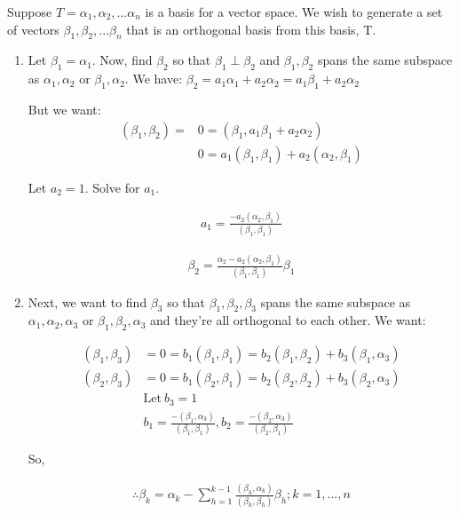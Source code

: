 Suppose $T = {\alpha_1, \alpha_2, ... \alpha_n}$ is a basis for a vector space. We wish to generate a set of vectors ${\beta_1, \beta_2, ... \beta_n}$ that is an orthogonal basis from this basis, T.

\begin{enumerate}
  \item Let $\beta_1 = \alpha_1$. Now, find $\beta_2$ so that $\beta_1 \perp \beta_2$ and $\beta_1, \beta_2$ spans the same subspace as ${\alpha_1, \alpha_2}$ or ${\beta_1, \alpha_2}$. We have: $\beta_2 = a_1\alpha_1 + a_2\alpha_2 = a_1\beta_1 + a_2\alpha_2$

  But we want:
  \begin{align*}
    (\beta_1, \beta_2) = &0 = (\beta_1, a_1\beta_1 + a_2\alpha_2) \\ 
                         &0 = a_1(\beta_1, \beta_1) + a_2(\alpha_2, \beta_1)
  \end{align*}

  Let $a_2 = 1$. Solve for $a_1$.

  \begin{align*}
    a_1 = \frac{-a_2(\alpha_2, \beta_1)}{(\beta_1, \beta_1)}
  \end{align*}

  \begin{align*}
    \beta_2 = \frac{\alpha_2 - a_2(\alpha_2, \beta_1)}{(\beta_1, \beta_1)} \beta_1
  \end{align*}

  \item Next, we want to find $\beta_3$ so that ${\beta_1, \beta_2, \beta_3}$ spans the same subspace as ${\alpha_1, \alpha_2, \alpha_3}$ or ${\beta_1, \beta_2, \alpha_3}$ and they're all orthogonal to each other. We want:

  \begin{align*}
    (\beta_1, \beta_3) &= 0 = b_1(\beta_1, \beta_1) = b_2(\beta_1, \beta_2) + b_3(\beta_1, \alpha_3) \\
    (\beta_2, \beta_3) &= 0 = b_1(\beta_2, \beta_1) = b_2(\beta_2, \beta_2) + b_3(\beta_2, \alpha_3) \\
                       &\text{Let}\ b_3 = 1 \\
                       &b_1 = \frac{-(\beta_1, \alpha_3)}{(\beta_1, \beta_1)}, b_2 = \frac{-(\beta_2, \alpha_3)}{(\beta_2, \beta_1)}
  \end{align*}

  So,

  \begin{align*}
    \therefore \beta_k = \alpha_k - \sum_{h=1}^{k-1} \frac{(\beta_h, \alpha_k)}{(\beta_h, \beta_h)} \beta_h; k = 1, ..., n
  \end{align*}


\end{enumerate}
